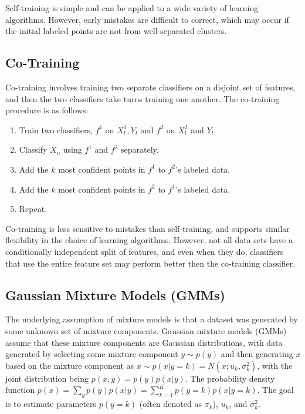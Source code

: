 \documentclass[12pt,titlepage]{article}
\begin{document}
      Self-training is simple and can be applied to a wide variety of learning algorithms. However, early mistakes are difficult to correct, which
      may occur if the initial labeled points are not from well-separated clusters.

    \subsection{Co-Training}
      Co-training involves training two separate classifiers on a disjoint set of features, and then the two classifiers take turns training one another.
      The co-training procedure is as follows:

      \begin{enumerate}
        \item Train two classifiers, $f^1$ on $X_l^1, Y_l$ and $f^2$ on $X_l^2$ and $Y_l$.
        \item Classify $X_u$ using $f^1$ and $f^2$ separately.
        \item Add the $k$ most confident points in $f^1$ to $f^2$'s labeled data.
        \item Add the $k$ most confident points in $f^2$ to $f^1$'s labeled data.
        \item Repeat.
      \end{enumerate}

      Co-training is less sensitive to mistakes than self-training, and supports similar flexibility in the choice of learning algorithms. However,
      not all data sets have a conditionally independent split of features, and even when they do, classifiers that use the entire feature set may
      perform better then the co-training classifier.

    \subsection{Gaussian Mixture Models (GMMs)}
      The underlying assumption of mixture models is that a dataset was generated by some unknown set of mixture components. Gaussian mixture models (GMMs)
      assume that these mixture components are Gaussian distributions, with data generated by selecting some mixture component $y \sim p(y)$ and then generating
      $x$ based on the mixture component as $x \sim p(x|y=k) = N(x; u_k, \sigma_k^2)$, with the joint distribution being $p(x,y) = p(y)p(x|y)$. The
      probability density function $p(x) = \sum_y p(y) p(x|y) = \sum_{k=1}^K p(y=k) p(x|y=k)$. The goal is to estimate parameters $p(y=k)$ (often
      denoted as $\pi_k$), $u_k$, and $\sigma_k^2$.
\end{document}

